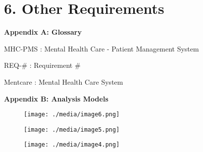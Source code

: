 \documentclass[12pt]{article}
\renewcommand{\_}{\kern-1.5pt\textunderscore\kern-1.5pt}
\begin{document}
\vspace{\baselineskip}

\vspace{\baselineskip}
\section*{6. \hspace*{10pt}Other Requirements}
\setlength{\parskip}{12.0pt}
{\fontsize{14pt}{16.8pt}\selectfont \textbf{Appendix A: Glossary}\par}\par

MHC-PMS : Mental Health Care - Patient Management System\par

REQ-$\#$  : Requirement $\#$ \par

Mentcare : Mental Health Care System\par

{\fontsize{14pt}{16.8pt}\selectfont \textbf{Appendix B: Analysis Models}\par}\par


\vspace{\baselineskip}




\begin{figure}[H]
	\begin{Center}
		\texttt{[image: ./media/image6.png]}
	\end{Center}
\end{figure}




\par





\begin{figure}[H]
	\begin{Center}
		\texttt{[image: ./media/image5.png]}
	\end{Center}
\end{figure}




\par





\begin{figure}[H]
	\begin{Center}
		\texttt{[image: ./media/image4.png]}
	\end{Center}
\end{figure}
\end{document}
